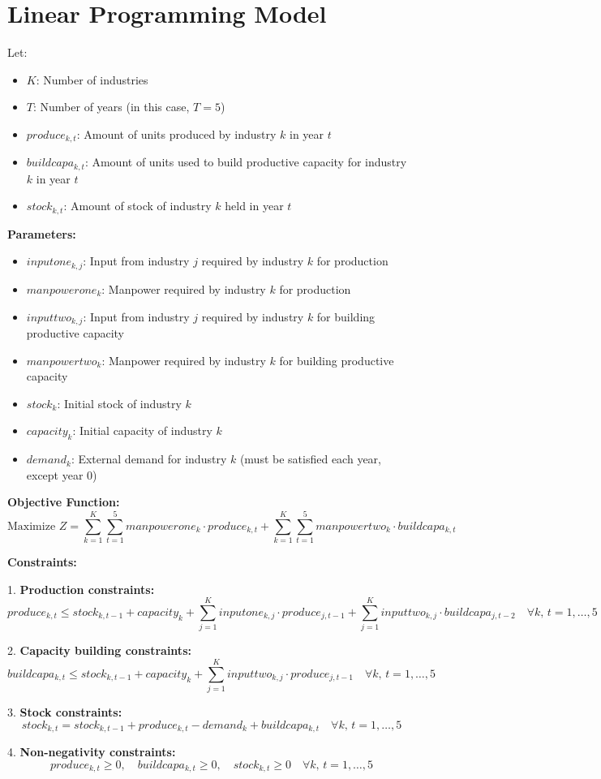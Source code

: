 \documentclass{article}
\begin{document}
\section*{Linear Programming Model}

Let:
\begin{itemize}
    \item $K$: Number of industries
    \item $T$: Number of years (in this case, $T = 5$)
    \item $produce_{k, t}$: Amount of units produced by industry $k$ in year $t$
    \item $buildcapa_{k, t}$: Amount of units used to build productive capacity for industry $k$ in year $t$
    \item $stock_{k, t}$: Amount of stock of industry $k$ held in year $t$
\end{itemize}

\textbf{Parameters:}
\begin{itemize}
    \item $inputone_{k,j}$: Input from industry $j$ required by industry $k$ for production
    \item $manpowerone_{k}$: Manpower required by industry $k$ for production
    \item $inputtwo_{k,j}$: Input from industry $j$ required by industry $k$ for building productive capacity
    \item $manpowertwo_{k}$: Manpower required by industry $k$ for building productive capacity
    \item $stock_{k}$: Initial stock of industry $k$
    \item $capacity_{k}$: Initial capacity of industry $k$
    \item $demand_{k}$: External demand for industry $k$ (must be satisfied each year, except year 0)
\end{itemize}

\textbf{Objective Function:}
\[
\text{Maximize } Z = \sum_{k=1}^{K} \sum_{t=1}^{5} manpowerone_k \cdot produce_{k,t} + \sum_{k=1}^{K} \sum_{t=1}^{5} manpowertwo_k \cdot buildcapa_{k,t}
\]

\textbf{Constraints:}

1. \textbf{Production constraints:}
   \[
   produce_{k, t} \leq stock_{k, t-1} + capacity_{k} + \sum_{j=1}^{K} inputone_{k,j} \cdot produce_{j,t-1} + \sum_{j=1}^{K} inputtwo_{k,j} \cdot buildcapa_{j,t-2} \quad \forall k, \, t = 1, \ldots, 5
   \]

2. \textbf{Capacity building constraints:}
   \[
   buildcapa_{k, t} \leq stock_{k, t-1} + capacity_{k} + \sum_{j=1}^{K} inputtwo_{k,j} \cdot produce_{j,t-1} \quad \forall k, \, t = 1, \ldots, 5
   \]

3. \textbf{Stock constraints:}
   \[
   stock_{k, t} = stock_{k, t-1} + produce_{k, t} - demand_{k} + buildcapa_{k, t} \quad \forall k, \, t = 1, \ldots, 5
   \]

4. \textbf{Non-negativity constraints:}
   \[
   produce_{k, t} \geq 0, \quad buildcapa_{k, t} \geq 0, \quad stock_{k, t} \geq 0 \quad \forall k, \, t = 1, \ldots, 5
   \]
\end{document}
